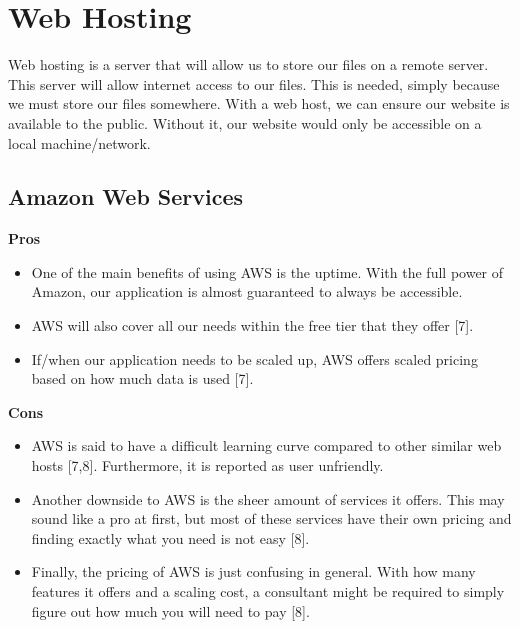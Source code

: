 \documentclass[onecolumn, draftclsnofoot,10pt, compsoc]{IEEEtran}
\begin{document}
\section{Web Hosting}
Web hosting is a server that will allow us to store our files on a remote server. This server will allow internet access to our files. This is needed, simply because we must store our files somewhere. With a web host, we can ensure our website is available to the public. Without it, our website would only be accessible on a local machine/network.
	\subsection{Amazon Web Services}	
		\textbf{Pros}
			\begin{itemize}
				\item One of the main benefits of using AWS is the uptime. With the full power of Amazon, our application is almost guaranteed to always be accessible. 
				\item AWS will also cover all our needs within the free tier that they offer [7]. 
				\item If/when our application needs to be scaled up, AWS offers scaled pricing based on how much data is used [7].
			\end{itemize}
		\textbf{Cons}
			\begin{itemize}
				\item AWS is said to have a difficult learning curve compared to other similar web hosts [7,8]. Furthermore, it is reported as user unfriendly. 
				\item Another downside to AWS is the sheer amount of services it offers. This may sound like a pro at first, but most of these services have their own pricing and finding exactly what you need is not easy [8]. 
				\item Finally, the pricing of AWS is just confusing in general. With how many features it offers and a scaling cost, a consultant might be required to simply figure out how much you will need to pay [8].
			\end{itemize}
			
\end{document}
